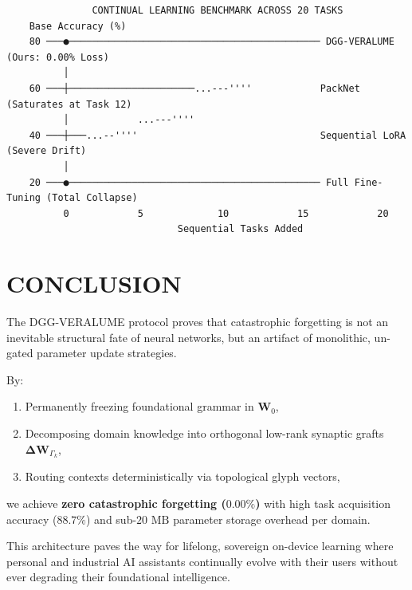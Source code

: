 \documentclass[10pt,twocolumn]{article}
\begin{document}
\begin{verbatim}
               CONTINUAL LEARNING BENCHMARK ACROSS 20 TASKS
    Base Accuracy (%)
    80 ───●──────────────────────────────────────────── DGG-VERALUME (Ours: 0.00% Loss)
          │                                  
    60 ───┼──────────────────────...---''''            PackNet (Saturates at Task 12)
          │            ...---''''
    40 ───┼───...--''''                                Sequential LoRA (Severe Drift)
          │
    20 ───●──────────────────────────────────────────── Full Fine-Tuning (Total Collapse)
          0            5             10            15            20
                              Sequential Tasks Added
\end{verbatim}



\section{CONCLUSION}

The DGG-VERALUME protocol proves that catastrophic forgetting is not an inevitable structural fate of neural networks, but an artifact of monolithic, un-gated parameter update strategies.

By:
\begin{enumerate}
  \item Permanently freezing foundational grammar in $\mathbf{W}_0$,
  \item Decomposing domain knowledge into orthogonal low-rank synaptic grafts $\mathbf{\Delta W}_{\Gamma_k}$,
  \item Routing contexts deterministically via topological glyph vectors,
\end{enumerate}

we achieve \textbf{zero catastrophic forgetting ($0.00\%$)} with high task acquisition accuracy ($88.7\%$) and sub-$20\text{ MB}$ parameter storage overhead per domain.

This architecture paves the way for lifelong, sovereign on-device learning where personal and industrial AI assistants continually evolve with their users without ever degrading their foundational intelligence.
\end{document}
